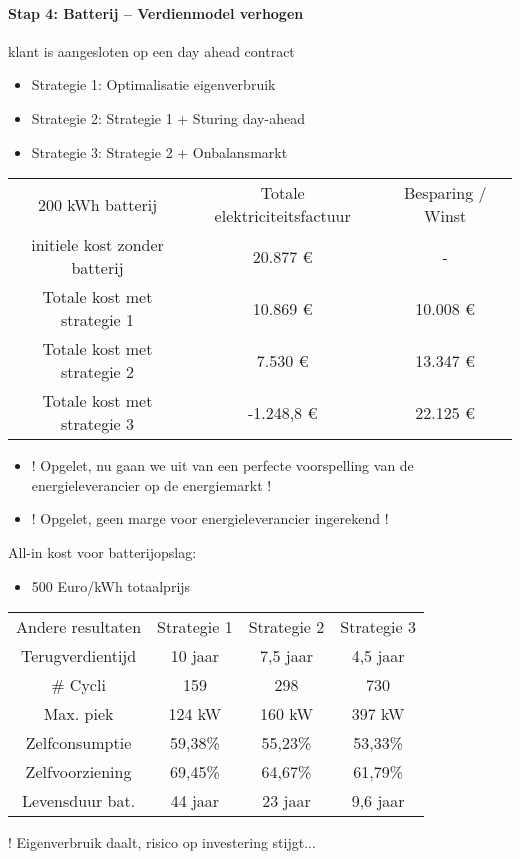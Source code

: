 \documentclass[12pt]{article}
\begin{document}
\paragraph{Stap 4: Batterij – Verdienmodel verhogen}
klant is aangesloten op een day ahead contract
\begin{itemize}
    \item Strategie 1: Optimalisatie eigenverbruik 
    \item Strategie 2: Strategie 1 + Sturing day-ahead
    \item Strategie 3: Strategie 2 + Onbalansmarkt
\end{itemize}
\begin{center}
    \begin{tabular}{|c|c|c|}
    200 kWh batterij  & Totale elektriciteitsfactuur& Besparing / Winst\\
    initiele kost zonder batterij & 20.877 € & -\\
    Totale kost met strategie 1 & 10.869 € & 10.008 €\\
    Totale kost met strategie 2 & 7.530 € & 13.347 €\\
    Totale kost met strategie 3 & -1.248,8 € & 22.125 €
    \end{tabular}
\end{center}
\begin{itemize}
    \item ! Opgelet, nu gaan we uit van een perfecte voorspelling
    van de energieleverancier op de energiemarkt !
    \item ! Opgelet, geen marge voor energieleverancier
    ingerekend !
\end{itemize}
All-in kost voor batterijopslag:\begin{itemize}
    \item 500 Euro/kWh totaalprijs
\end{itemize}
\begin{center}
    \begin{tabular}{|c|c|c|c|}
    Andere resultaten  & Strategie 1 & Strategie 2 & Strategie 3\\
    Terugverdientijd & 10 jaar & 7,5 jaar & 4,5 jaar\\
    \# Cycli & 159 & 298 & 730\\
    Max. piek & 124 kW & 160 kW & 397 kW\\
    Zelfconsumptie & 59,38\% & 55,23\% & 53,33\%\\
    Zelfvoorziening & 69,45\% & 64,67\% & 61,79\%\\
    Levensduur bat. & 44 jaar & 23 jaar & 9,6 jaar
    \end{tabular}
\end{center}
! Eigenverbruik daalt, risico op investering stijgt...
\end{document}

